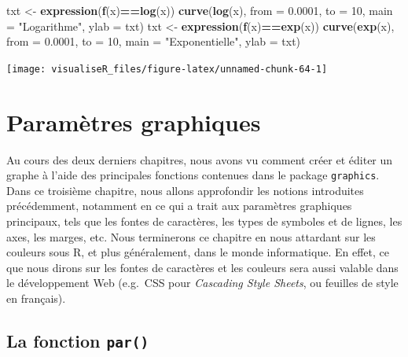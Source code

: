 \documentclass[]{article}
\newenvironment{Shaded}{\begin{snugshade}}{\end{snugshade}}
\newcommand{\DataTypeTok}[1]{\textcolor[rgb]{0.13,0.29,0.53}{#1}}
\newcommand{\DecValTok}[1]{\textcolor[rgb]{0.00,0.00,0.81}{#1}}
\newcommand{\FloatTok}[1]{\textcolor[rgb]{0.00,0.00,0.81}{#1}}
\newcommand{\KeywordTok}[1]{\textcolor[rgb]{0.13,0.29,0.53}{\textbf{#1}}}
\newcommand{\NormalTok}[1]{#1}
\newcommand{\OperatorTok}[1]{\textcolor[rgb]{0.81,0.36,0.00}{\textbf{#1}}}
\newcommand{\StringTok}[1]{\textcolor[rgb]{0.31,0.60,0.02}{#1}}
\begin{document}
\begin{Shaded}
\begin{Highlighting}[]
\NormalTok{txt <-}\StringTok{ }\KeywordTok{expression}\NormalTok{(}\KeywordTok{f}\NormalTok{(x)}\OperatorTok{==}\KeywordTok{log}\NormalTok{(x))}
\KeywordTok{curve}\NormalTok{(}\KeywordTok{log}\NormalTok{(x), }\DataTypeTok{from =} \FloatTok{0.0001}\NormalTok{, }\DataTypeTok{to =} \DecValTok{10}\NormalTok{, }\DataTypeTok{main =} \StringTok{"Logarithme"}\NormalTok{, }\DataTypeTok{ylab =}\NormalTok{ txt)}
\NormalTok{txt <-}\StringTok{ }\KeywordTok{expression}\NormalTok{(}\KeywordTok{f}\NormalTok{(x)}\OperatorTok{==}\KeywordTok{exp}\NormalTok{(x))}
\KeywordTok{curve}\NormalTok{(}\KeywordTok{exp}\NormalTok{(x), }\DataTypeTok{from =} \FloatTok{0.0001}\NormalTok{, }\DataTypeTok{to =} \DecValTok{10}\NormalTok{, }\DataTypeTok{main =} \StringTok{"Exponentielle"}\NormalTok{, }\DataTypeTok{ylab =}\NormalTok{ txt)}
\end{Highlighting}
\end{Shaded}

\begin{center}\texttt{[image: visualiseR\_files/figure-latex/unnamed-chunk-64-1]} \end{center}

\hypertarget{paramuxe8tres-graphiques}{%
\section{Paramètres graphiques}\label{paramuxe8tres-graphiques}}

Au cours des deux derniers chapitres, nous avons vu comment créer et éditer un graphe à l'aide des principales fonctions contenues dans le package \texttt{graphics}. Dans ce troisième chapitre, nous allons approfondir les notions introduites précédemment, notamment en ce qui a trait aux paramètres graphiques principaux, tels que les fontes de caractères, les types de symboles et de lignes, les axes, les marges, etc. Nous terminerons ce chapitre en nous attardant sur les couleurs sous R, et plus généralement, dans le monde informatique. En effet, ce que nous dirons sur les fontes de caractères et les couleurs sera aussi valable dans le développement Web (e.g.~CSS pour \emph{Cascading Style Sheets}, ou feuilles de style en français).

\hypertarget{la-fonction-par}{%
\subsection{\texorpdfstring{La fonction \texttt{par()}}{La fonction par()}}\label{la-fonction-par}}
\end{document}

